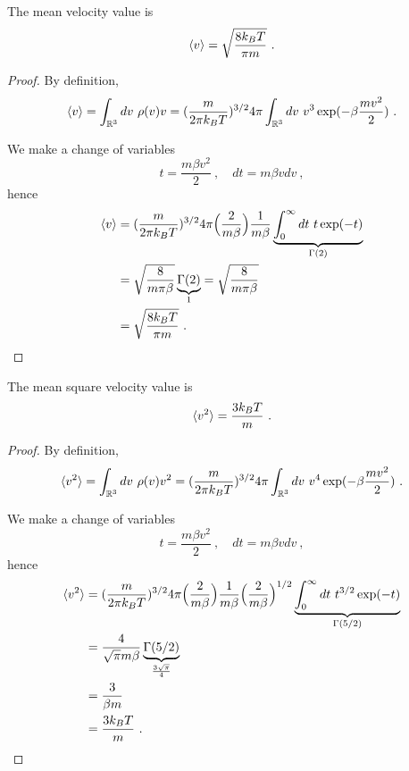     The mean velocity value is 
    \begin{equation*}
        \langle v\rangle = \sqrt{\frac{8 k_B T}{\pi m}} ~.
    \end{equation*}
    \begin{proof}
        By definition, 
        \begin{equation*}
            \langle v\rangle = \int_{\mathbb R^3} dv ~ \rho(v) v = (\frac{m}{2\pi k_B T})^{3/2} 4 \pi \int_{\mathbb R^3} dv ~ v^3 \exp(- \beta \frac{m v^2}{2}) ~.
        \end{equation*}

        We make a change of variables 
        \begin{equation*}
            t = \frac{m \beta v^2}{2} ~, \quad dt = m \beta v dv ~,
        \end{equation*}
        hence 
        \begin{equation*}
        \begin{aligned}
            \langle v\rangle & =  (\frac{m}{2\pi k_B T})^{3/2} 4 \pi \Big (\frac{2}{m \beta} \Big) \frac{1}{m \beta} \underbrace{\int_0^\infty dt ~ t \exp(- t)}_{\Gamma (2)} \\ & = \sqrt{\frac{8}{m \pi \beta}} \underbrace{\Gamma (2)}_1 = \sqrt{\frac{8}{m \pi \beta}} \\ & = \sqrt{\frac{8 k_B T}{\pi m}} ~.
        \end{aligned}
        \end{equation*}
    \end{proof}

    The mean square velocity value is 
    \begin{equation*}
        \langle v^2\rangle = \frac{3 k_B T}{m} ~.
    \end{equation*}
    \begin{proof}
        By definition, 
        \begin{equation*}
            \langle v^2\rangle = \int_{\mathbb R^3} dv ~ \rho(v) v^2 = (\frac{m}{2\pi k_B T})^{3/2} 4 \pi \int_{\mathbb R^3} dv ~ v^4 \exp(- \beta \frac{m v^2}{2}) ~.
        \end{equation*}

        We make a change of variables 
        \begin{equation*}
            t = \frac{m \beta v^2}{2} ~, \quad dt = m \beta v dv ~,
        \end{equation*}
        hence 
        \begin{equation*}
        \begin{aligned}
            \langle v^2\rangle & =  (\frac{m}{2\pi k_B T})^{3/2} 4 \pi \Big (\frac{2}{m \beta} \Big) \frac{1}{m \beta} \Big ( \frac{2}{m \beta} \Big)^{1/2} \underbrace{\int_0^\infty dt ~ t^{3/2} \exp(- t)}_{\Gamma (5/2)} \\ & = \frac{4}{\sqrt{\pi} m \beta} \underbrace{\Gamma (5/2)}_{\frac{3 \sqrt{\pi}}{4}} \\ & = \frac{3}{\beta m} \\ & = \frac{3 k_B T}{m} ~.
        \end{aligned}
        \end{equation*}
    \end{proof}

